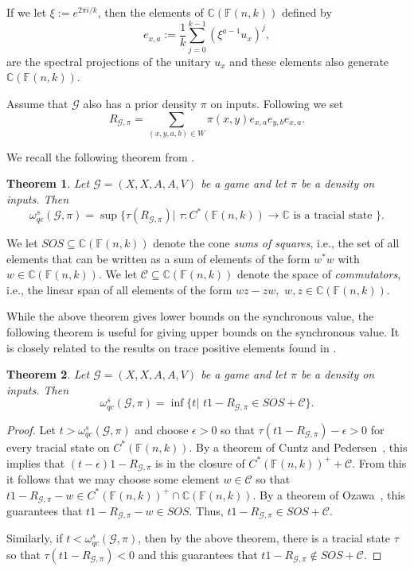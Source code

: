 \documentclass[11pt]{amsart}
\newtheorem{thm}{Theorem}[section]
\theoremstyle{definition}
\newcommand{\bb}[1]{\mathbb{#1}}
\newcommand{\cl}[1]{\mathcal{#1}}
\begin{document}
If we let $\xi := e^{2 \pi i/k}$, then the elements of $\bb C(\bb F(n,k))$ defined by
\[ e_{x,a} := \frac{1}{k}\sum_{j=0}^{k-1} (\xi^{a-1}u_x)^j,\]
are the spectral projections of the unitary $u_x$ and these elements also generate $\bb C(\bb F(n,k))$.

Assume that $\cl G$ also has a prior density $\pi$ on inputs.  Following \cite{HMNPR} we set
\[ R_{\cl G, \pi} = \sum_{(x,y,a,b) \in W} \pi(x,y) e_{x,a} e_{y,b} e_{x,a}.\]

We recall the following theorem from \cite{HMNPR}.

\begin{thm}\cite{HMNPR} Let $\cl G= (X, X, A, A, V)$ be a game and let $\pi$ be a density on inputs.  Then
\[ \omega_{qc}^s(\cl G, \pi) = \sup \{ \tau(R_{\cl G, \pi}) \vert \,\, \tau: C^*(\bb F(n,k)) \to \bb C \text{ is a tracial state } \}.\]
\end{thm}

We let $SOS \subseteq \bb C(\bb F(n,k))$ denote the cone {\it sums of squares}, i.e., the set of all elements that can be written as a sum of elements of the form $w^*w$ with $w \in \bb C(\bb F(n,k))$.  We let
$\cl C \subseteq \bb C(\bb F(n,k))$ denote the space of {\it commutators}, i.e., the linear span of all elements of the form $wz- zw, \,\, w,z \in \bb C(\bb F(n,k))$.

While the above theorem gives lower bounds on the synchronous value, the following theorem is useful for giving upper bounds on the synchronous value. It is closely related to the results on trace positive elements found in \cite{JP}.

\begin{thm}\label{thm:SOS+C} Let $\cl G= (X, X, A, A, V)$ be a game and let $\pi$ be a density on inputs. Then
\[ \omega^s_{qc}(\cl G, \pi) = \inf \{ t \vert \,\, t1 - R_{\cl G, \pi} \in SOS + \cl C \}.\]
\end{thm}
\begin{proof} Let $t > \omega_{qc}^s(\cl G, \pi)$ and choose $\epsilon >0$ so that  $\tau(t1 - R_{\cl G, \pi}) - \epsilon >0$ for every tracial state on $C^*(\bb F(n,k))$. By a theorem of Cuntz and Pedersen~\cite[Theorem~2.9]{CP}, this implies that $(t- \epsilon)1 - R_{\cl G, \pi}$ is in the closure of $C^*(\bb F(n,k))^+ + \cl C$. From this it follows that we may choose some element $w \in \cl C$ so that $t1 - R_{\cl G, \pi} - w \in C^*(\bb F(n,k))^+ \cap \bb C(\bb F(n,k))$.  By a theorem of Ozawa~\cite[Theorem~1]{Oz14}, this guarantees that $t1 - R_{\cl G, \pi} - w \in SOS$.  Thus, $t1 - R_{\cl G, \pi} \in SOS + \cl C$.

Similarly, if $t < \omega_{qc}^s(\cl G, \pi)$, then by the above theorem, there is a tracial state $\tau$ so that
$\tau(t1 - R_{\cl G, \pi}) <0$ and this guarantees that $t1 - R_{\cl G, \pi} \notin SOS + \cl C$.
\end{proof}
\end{document}
